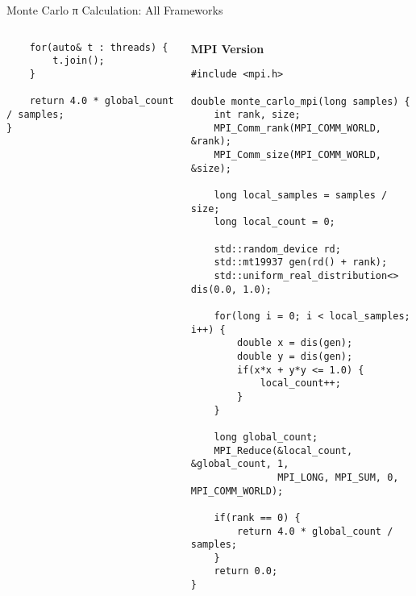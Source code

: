 \begin{frame}[fragile]{ Monte Carlo π Calculation: All Frameworks}
\begin{columns}
\begin{column}{0.35\textwidth}
\begin{verbatim}
    for(auto& t : threads) {
        t.join();
    }

    return 4.0 * global_count / samples;
}
			\end{verbatim}
		\end{column}
		\begin{column}{0.35\textwidth}
			\textbf{MPI Version}
			\begin{verbatim}
#include <mpi.h>

double monte_carlo_mpi(long samples) {
    int rank, size;
    MPI_Comm_rank(MPI_COMM_WORLD, &rank);
    MPI_Comm_size(MPI_COMM_WORLD, &size);

    long local_samples = samples / size;
    long local_count = 0;

    std::random_device rd;
    std::mt19937 gen(rd() + rank);
    std::uniform_real_distribution<> dis(0.0, 1.0);

    for(long i = 0; i < local_samples; i++) {
        double x = dis(gen);
        double y = dis(gen);
        if(x*x + y*y <= 1.0) {
            local_count++;
        }
    }

    long global_count;
    MPI_Reduce(&local_count, &global_count, 1,
               MPI_LONG, MPI_SUM, 0, MPI_COMM_WORLD);

    if(rank == 0) {
        return 4.0 * global_count / samples;
    }
    return 0.0;
}
			\end{verbatim}
		\end{column}
	\end{columns}
\end{frame}

